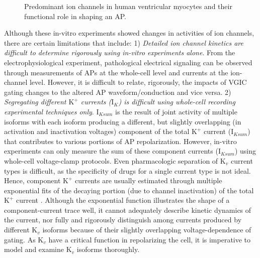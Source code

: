 \documentclass[10pt,letterpaper]{article}
\begin{document}
\begin{figure}[!ht]
    \centering
    \caption{Predominant ion channels in human ventricular myocytes and their functional role in shaping an AP.}
    \label{fig2}
\end{figure}

Although these in-vitro experiments showed changes in activities of ion channels, there are certain limitations that include: 1) \textit{Detailed ion channel kinetics are difficult to determine rigorously using in-vitro experiments alone}. From the electrophysiological experiment, pathological electrical signaling can be observed through measurements of APs at the whole-cell level and currents at the ion-channel level. However, it is difficult to relate, rigorously, the impacts of VGIC gating changes to the altered AP waveform/conduction and vice versa. 2) \textit{Segregating different $\text{K}^{+}$ currents ($\text{I}_{K}$) is difficult using whole-cell recording experimental techniques only}. $\text{I}_{Ksum}$ is the result of joint activity of multiple isoforms with each isoform producing a different, but slightly overlapping (in activation and inactivation voltages) component of the total $\text{K}^{+}$ current ($\text{I}_{Ksum}$) \cite{du2017} that contributes to various portions of AP repolarization. However, in-vitro experiments can only measure the sum of these component currents ($\text{I}_{Ksum}$) using whole-cell voltage-clamp protocols. Even pharmacologic separation of $\text{K}_{v}$ current types is difficult, as the specificity of drugs for a single current type is not ideal. Hence, component $\text{K}^{+}$ currents are usually estimated through multiple exponential fits of the decaying portion (due to channel inactivation) of the total $\text{K}^{+}$ current \cite{brunet2004heterogeneous}. Although the exponential function illustrates the shape of a component-current trace well, it cannot adequately describe kinetic dynamics of the current, nor fully and rigorously distinguish among currents produced by different $\text{K}_{v}$ isoforms because of their slightly overlapping voltage-dependence of gating. As $\text{K}_{v}$ have a critical function in repolarizing the cell, it is imperative to model and examine $\text{K}_{v}$ isoforms thoroughly.
\end{document}

